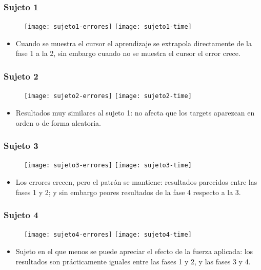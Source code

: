 \begin{frame}
	\frametitle{Sujeto 1}
	\begin{figure}
		\centering
		
		\texttt{[image: sujeto1-errores]}
		\texttt{[image: sujeto1-time]}
	\end{figure}
	\begin{itemize}
		\item Cuando se muestra el cursor el aprendizaje se extrapola directamente de la fase 1 a la 2, sin embargo cuando no se muestra el cursor el error crece.
	\end{itemize}
\end{frame}
\begin{frame}
	\frametitle{Sujeto 2}
	\begin{figure}
		\centering
		
		\texttt{[image: sujeto2-errores]}
		\texttt{[image: sujeto2-time]}
	\end{figure}
	\begin{itemize}
		\item Resultados muy similares al sujeto 1: no afecta que los targets aparezcan en orden o de forma aleatoria.
	\end{itemize}
\end{frame}
\begin{frame}
	\frametitle{Sujeto 3}
	\begin{figure}
		\centering
		
		\texttt{[image: sujeto3-errores]}
		\texttt{[image: sujeto3-time]}
	\end{figure}
	\begin{itemize}
		\item Los errores crecen, pero el patrón se mantiene: resultados parecidos entre las fases 1 y 2; y sin embargo peores resultados de la fase 4 respecto a la 3.
	\end{itemize}
\end{frame}
\begin{frame}
	\frametitle{Sujeto 4}
	\begin{figure}
		\centering
		
		\texttt{[image: sujeto4-errores]}
		\texttt{[image: sujeto4-time]}
	\end{figure}
	\begin{itemize}
		\item Sujeto en el que menos se puede apreciar el efecto de la fuerza aplicada: los resultados son prácticamente iguales entre las fases 1 y 2, y las fases 3 y 4.
	\end{itemize}
\end{frame}
